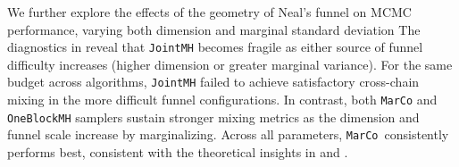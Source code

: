 \documentclass[onefignum,onetabnum]{siamonline250211}
\newcommand{\MarCo}{\textnormal{\texttt{MarCo}}\xspace}
\newcommand{\Joint}{\textnormal{\texttt{JointMH}}\xspace}
\newcommand{\OneblockMCMC}{\textnormal{\texttt{OneBlockMH}}\xspace}
\begin{document}
We further explore the effects of the geometry of Neal's funnel on MCMC performance, varying both dimension and marginal standard deviation
The diagnostics in  reveal that \Joint becomes fragile as either source of funnel difficulty increases (higher dimension or greater marginal variance).
For the same budget across algorithms, \Joint failed to achieve satisfactory cross-chain mixing in the more difficult funnel configurations.
%
In contrast, both \MarCo and \OneblockMCMC samplers sustain stronger mixing metrics as the dimension and funnel scale increase by marginalizing.  
%
Across all parameters, \MarCo\ consistently performs best, consistent with the theoretical insights in  and . 
\end{document}
